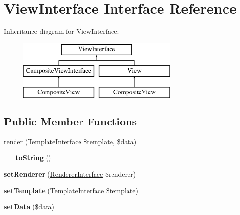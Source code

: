 \hypertarget{interface_pes_1_1_view_1_1_view_interface}{}\section{View\+Interface Interface Reference}
\label{interface_pes_1_1_view_1_1_view_interface}
Inheritance diagram for View\+Interface\+:\begin{figure}[H]
\begin{center}
\leavevmode
\includegraphics[height=3.000000cm]{interface_pes_1_1_view_1_1_view_interface}
\end{center}
\end{figure}
\subsection*{Public Member Functions}
\begin{DoxyCompactItemize}
\item 
\mbox{\hyperlink{interface_pes_1_1_view_1_1_view_interface_ab273a8d7deb9bb9235161c4f8419e402}{render}} (\mbox{\hyperlink{interface_pes_1_1_view_1_1_template_1_1_template_interface}{Template\+Interface}} \$template, \$data)
\item 
\mbox{\label{interface_pes_1_1_view_1_1_view_interface_a7516ca30af0db3cdbf9a7739b48ce91d}} 
{\bfseries \+\_\+\+\_\+to\+String} ()
\item 
\mbox{\label{interface_pes_1_1_view_1_1_view_interface_a2858c054f485d8b15887f6cbbdc4087b}} 
{\bfseries set\+Renderer} (\mbox{\hyperlink{interface_pes_1_1_view_1_1_renderer_1_1_renderer_interface}{Renderer\+Interface}} \$renderer)
\item 
\mbox{\label{interface_pes_1_1_view_1_1_view_interface_aa36ace36242d7477b0f7ad44a05bd292}} 
{\bfseries set\+Template} (\mbox{\hyperlink{interface_pes_1_1_view_1_1_template_1_1_template_interface}{Template\+Interface}} \$template)
\item 
\mbox{\label{interface_pes_1_1_view_1_1_view_interface_a5ae172026b770b4c669fe7478120591c}} 
{\bfseries set\+Data} (\$data)
\end{DoxyCompactItemize}


